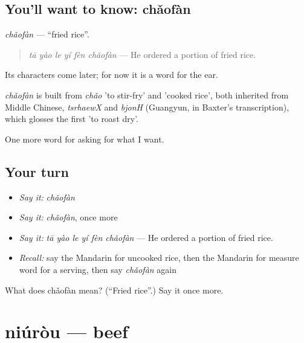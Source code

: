 \subsection*{You'll want to know: chǎofàn}
\emph{chǎofàn} — \textquotedblleft{}fried rice\textquotedblright{}.

\begin{quote}
\emph{tā yào le yí fèn chǎofàn} — He ordered a portion of fried rice.
\end{quote}

Its characters come later; for now it is a word for the ear.

\begin{cousinweb}
\emph{chǎofàn} is built from \emph{chǎo} 'to stir-fry' and  'cooked rice', both inherited from Middle Chinese, \emph{tsrhaewX} and \emph{bjonH} (Guangyun, in Baxter's transcription), which glosses the first 'to roast dry'.
\end{cousinweb}

\begin{grammarlens}[title={What you've built}]
One more word for asking for what I want.
\end{grammarlens}

\subsection*{Your turn}
\begin{itemize}
\raggedright
  \item \emph{Say it:} \emph{chǎofàn}
  \item \emph{Say it:} \emph{chǎofàn}, once more
  \item \emph{Say it:} \emph{tā yào le yí fèn chǎofàn} — He ordered a portion of fried rice.
  \item \emph{Recall:} say the Mandarin for uncooked rice, then the Mandarin for measure word for a serving, then say \emph{chǎofàn} again
\end{itemize}

\begin{tcolorbox}[breakable,colback=teal!4,colframe=teal!35!black,title={Before you move on}]
What does chǎofàn mean? (\textquotedblleft{}Fried rice\textquotedblright{}.) Say it once more.
\end{tcolorbox}
\section[niúròu]{niúròu — beef}

\label{lesson:ZH-C161-niurou}



